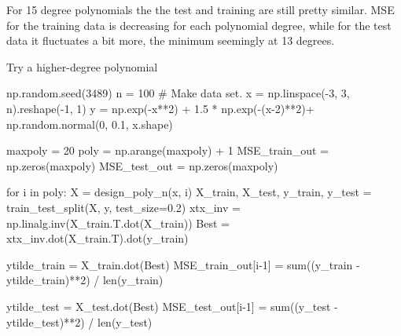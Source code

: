 \documentclass[
  letterpaper,
  DIV=11,
  numbers=noendperiod]{scrartcl}
\newenvironment{Shaded}{\begin{snugshade}}{\end{snugshade}}
\newcommand{\BuiltInTok}[1]{\textcolor[rgb]{0.00,0.23,0.31}{#1}}
\newcommand{\CommentTok}[1]{\textcolor[rgb]{0.37,0.37,0.37}{#1}}
\newcommand{\ControlFlowTok}[1]{\textcolor[rgb]{0.00,0.23,0.31}{#1}}
\newcommand{\DecValTok}[1]{\textcolor[rgb]{0.68,0.00,0.00}{#1}}
\newcommand{\FloatTok}[1]{\textcolor[rgb]{0.68,0.00,0.00}{#1}}
\newcommand{\KeywordTok}[1]{\textcolor[rgb]{0.00,0.23,0.31}{#1}}
\newcommand{\NormalTok}[1]{\textcolor[rgb]{0.00,0.23,0.31}{#1}}
\newcommand{\OperatorTok}[1]{\textcolor[rgb]{0.37,0.37,0.37}{#1}}
\begin{document}
For 15 degree polynomials the the test and training are still pretty
similar. MSE for the training data is decreasing for each polynomial
degree, while for the test data it fluctuates a bit more, the minimum
seemingly at 13 degrees.

Try a higher-degree polynomial

\begin{Shaded}
\begin{Highlighting}[]

\NormalTok{np.random.seed(}\DecValTok{3489}\NormalTok{)}
\NormalTok{n }\OperatorTok{=} \DecValTok{100}
\CommentTok{\# Make data set.}
\NormalTok{x }\OperatorTok{=}\NormalTok{ np.linspace(}\OperatorTok{{-}}\DecValTok{3}\NormalTok{, }\DecValTok{3}\NormalTok{, n).reshape(}\OperatorTok{{-}}\DecValTok{1}\NormalTok{, }\DecValTok{1}\NormalTok{)}
\NormalTok{y }\OperatorTok{=}\NormalTok{ np.exp(}\OperatorTok{{-}}\NormalTok{x}\OperatorTok{**}\DecValTok{2}\NormalTok{) }\OperatorTok{+} \FloatTok{1.5} \OperatorTok{*}\NormalTok{ np.exp(}\OperatorTok{{-}}\NormalTok{(x}\OperatorTok{{-}}\DecValTok{2}\NormalTok{)}\OperatorTok{**}\DecValTok{2}\NormalTok{)}\OperatorTok{+}\NormalTok{ np.random.normal(}\DecValTok{0}\NormalTok{, }\FloatTok{0.1}\NormalTok{, x.shape)}

\NormalTok{maxpoly }\OperatorTok{=} \DecValTok{20}
\NormalTok{poly }\OperatorTok{=}\NormalTok{ np.arange(maxpoly) }\OperatorTok{+} \DecValTok{1}
\NormalTok{MSE\_train\_out }\OperatorTok{=}\NormalTok{ np.zeros(maxpoly)}
\NormalTok{MSE\_test\_out }\OperatorTok{=}\NormalTok{ np.zeros(maxpoly)}

\ControlFlowTok{for}\NormalTok{ i }\KeywordTok{in}\NormalTok{ poly:}
\NormalTok{    X }\OperatorTok{=}\NormalTok{ design\_poly\_n(x, i)}
\NormalTok{    X\_train, X\_test, y\_train, y\_test }\OperatorTok{=}\NormalTok{ train\_test\_split(X, y, test\_size}\OperatorTok{=}\FloatTok{0.2}\NormalTok{)}
\NormalTok{    xtx\_inv }\OperatorTok{=}\NormalTok{ np.linalg.inv(X\_train.T.dot(X\_train))}
\NormalTok{    Best }\OperatorTok{=}\NormalTok{ xtx\_inv.dot(X\_train.T).dot(y\_train)}
    
\NormalTok{    ytilde\_train }\OperatorTok{=}\NormalTok{ X\_train.dot(Best)}
\NormalTok{    MSE\_train\_out[i}\OperatorTok{{-}}\DecValTok{1}\NormalTok{] }\OperatorTok{=} \BuiltInTok{sum}\NormalTok{((y\_train }\OperatorTok{{-}}\NormalTok{ ytilde\_train)}\OperatorTok{**}\DecValTok{2}\NormalTok{) }\OperatorTok{/} \BuiltInTok{len}\NormalTok{(y\_train)}
    
\NormalTok{    ytilde\_test }\OperatorTok{=}\NormalTok{ X\_test.dot(Best)}
\NormalTok{    MSE\_test\_out[i}\OperatorTok{{-}}\DecValTok{1}\NormalTok{] }\OperatorTok{=} \BuiltInTok{sum}\NormalTok{((y\_test }\OperatorTok{{-}}\NormalTok{ ytilde\_test)}\OperatorTok{**}\DecValTok{2}\NormalTok{) }\OperatorTok{/} \BuiltInTok{len}\NormalTok{(y\_test)}
\end{Highlighting}
\end{Shaded}
\end{document}
